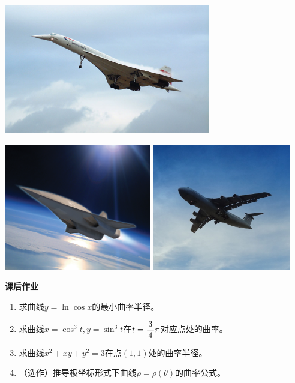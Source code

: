 \begin{center}
	\includegraphics[width=9cm]{./images/ch03/AP-1.jpg}
	
	\bigskip
	
	\includegraphics[height=5.5cm]{./images/ch03/AP-2.jpg}\quad
	\includegraphics[height=5.5cm]{./images/ch03/AP-3.jpg}
	
\end{center}

\begin{ext}
	{\bf 课后作业}
	
	\begin{enumerate}
	  \item 求曲线$y=\ln\cos x$的最小曲率半径。
	  \item 求曲线$x=\cos^3t,y=\sin^3t$在$t=\displaystyle\frac{\,{3}\,}{\,{4}\,}\pi$对应点处的曲率。
	  \item 求曲线$x^2+xy+y^2=3$在点$(1,1)$处的曲率半径。
	  \item （选作）推导极坐标形式下曲线$\rho=\rho(\theta)$的曲率公式。
	\end{enumerate}
\end{ext}


